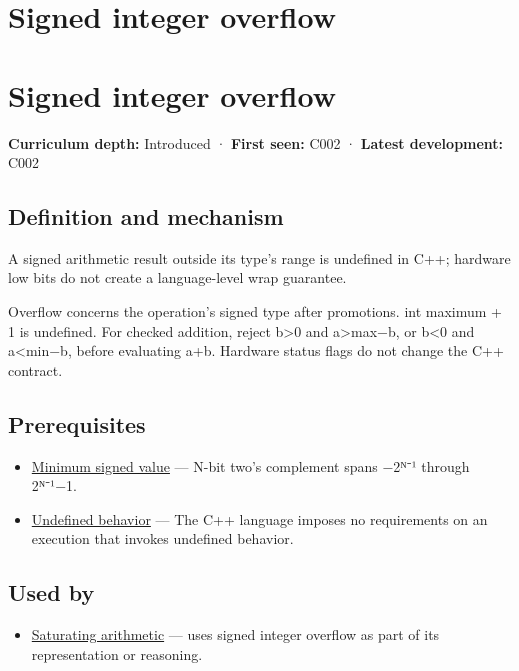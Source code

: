 \hypertarget{appendix-1a599c924a4e}{}
\section*{Signed integer overflow}
\section{Signed integer overflow}\label{signed-integer-overflow}

\textbf{Curriculum depth:} Introduced · \textbf{First seen:} C002 · \textbf{Latest development:} C002

\subsection{Definition and mechanism}\label{definition-and-mechanism}

A signed arithmetic result outside its type's range is undefined in C++; hardware low bits do not create a language-level wrap guarantee.

Overflow concerns the operation's signed type after promotions. int maximum + 1 is undefined. For checked addition, reject b\textgreater0 and a\textgreater max−b, or b\textless0 and a\textless min−b, before evaluating a+b. Hardware status flags do not change the C++ contract.

\subsection{Prerequisites}\label{prerequisites}

\begin{itemize}
\tightlist
\item
  \hyperref[appendix-05f39b10364d]{Minimum signed value} --- N-bit two's complement spans −2ᴺ⁻¹ through 2ᴺ⁻¹−1.
\item
  \hyperref[appendix-f558f5b4d8f2]{Undefined behavior} --- The C++ language imposes no requirements on an execution that invokes undefined behavior.
\end{itemize}

\subsection{Used by}\label{used-by}

\begin{itemize}
\tightlist
\item
  \hyperref[appendix-3999c6209649]{Saturating arithmetic} --- uses signed integer overflow as part of its representation or reasoning.
\end{itemize}

